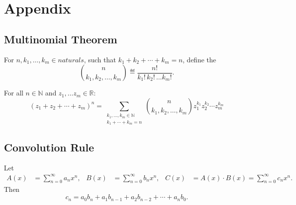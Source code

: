 \documentclass[handout]{mcs}
\begin{document}




\section{Appendix}

\subsection{Multinomial Theorem}

\begin{definition}
For $n,k_1,\dots,k_m \in naturals$, such that $k_1+k_2+\cdots+k_m = n$,
define the 
\[
\binom{n}{k_1, k_2, \dots, k_m} \eqdef \frac{n!}{k_1!\, k_2!\, \dots k_m!}.
\]
\end{definition}

\begin{theorem}\label{ml}
For all $n \in \mathbb{N}$ and $z_1, \dots z_m \in \mathbb{R}$:
\[
(z_1 + z_2 + \cdots + z_m)^n =
   \sum_{\substack{k_1, \dots, k_m \in \mathbb{N} \\
                   k_1 + \cdots + k_m = n}}
   \binom{n}{k_1, k_2, \dots, k_m} z_1^{k_1} z_2^{k_2} \cdots z_m^{k_m} 
\]
\end{theorem}


\subsection{Convolution Rule}

Let
\begin{align*}
A(x) & = \sum_{n=0}^{\infty} a_n x^n, &
B(x) & = \sum_{n=0}^{\infty} b_n x^n, &
C(x) & = A(x) \cdot B(x) = \sum_{n=0}^{\infty} c_n x^n.
\end{align*}
Then
\[
c_n = a_0 b_n + a_1 b_{n-1} + a_2 b_{n-2} + \cdots + a_n b_0.
\]
\end{document}
